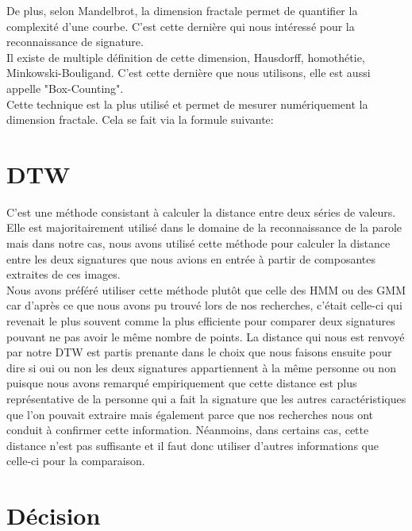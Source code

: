 \documentclass[pdftex,12pt,a4paper]{report}
\begin{document}
De plus, selon Mandelbrot, la dimension fractale permet de quantifier la complexité d'une courbe. C'est cette dernière qui nous intéressé pour la reconnaissance de signature.\\

Il existe de multiple définition de cette dimension, Hausdorff, homothétie, Minkowski-Bouligand. C'est cette dernière que nous utilisons, elle est aussi appelle "Box-Counting".\\

Cette technique est la plus utilisé et permet de mesurer numériquement la dimension fractale. Cela se fait via la formule suivante:

\vspace{0.3cm}
\begin{center}
\end{center}

\newpage

\chapter{DTW}
C'est une méthode consistant à calculer la distance entre deux séries de valeurs. Elle est majoritairement utilisé dans le domaine de la reconnaissance de la parole mais dans notre cas, nous avons utilisé cette méthode pour calculer la distance entre les deux signatures que nous avions en entrée à partir de composantes extraites de ces images. \\

Nous avons préféré utiliser cette méthode plutôt que celle des HMM ou des GMM car d'après ce que nous avons pu trouvé lors de nos recherches, c'était celle-ci qui revenait le plus souvent comme la plus efficiente pour comparer deux signatures pouvant ne pas avoir le même nombre de points. La distance qui nous est renvoyé par notre DTW est partis prenante dans le choix que nous faisons ensuite pour dire si oui ou non les deux signatures appartiennent à la même personne ou non puisque nous avons remarqué empiriquement que cette distance est plus représentative de la personne qui a fait la signature que les autres caractéristiques que l'on pouvait extraire mais également parce que nos recherches nous ont conduit à confirmer cette information. Néanmoins, dans certains cas, cette distance n'est pas suffisante et il faut donc utiliser d'autres informations que celle-ci pour la comparaison.

\chapter{Décision}

\newpage
\end{document}
